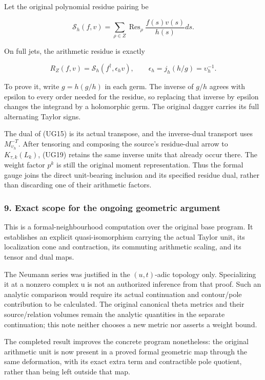 Let the original polynomial residue pairing be

\[
\mathscr S_h(f,v)=\sum_{\rho\in Z}\operatorname{Res}_\rho
\frac{f(s)v(s)}{h(s)}ds.
\]

On full jets, the arithmetic residue is exactly

\[
\boxed{R_Z(f,v)=\mathscr S_h(f^\dagger,\epsilon_hv),
\qquad\epsilon_h=j_h(h/g)=\upsilon_h^{-1}.}
\tag{UG19}
\]

To prove it, write \(g=h(g/h)\) in each germ. The inverse of \(g/h\) agrees with epsilon to every order needed for the residue, so replacing that inverse by epsilon changes the integrand by a holomorphic germ. The original dagger carries its full alternating Taylor signs.

The dual of (UG15) is its actual transpose, and the inverse-dual transport uses \(M_{\upsilon_h}^{-T}\). After tensoring and composing the source's residue-dual arrow to \(K_{\tau,k}(L_k)\), (UG19) retains the same inverse units that already occur there. The weight factor \(p^k\) is still the original moment representation. Thus the formal gauge joins the direct unit-bearing inclusion and its specified residue dual, rather than discarding one of their arithmetic factors.

\subsubsection{9. Exact scope for the ongoing geometric argument}\label{endpoint-f1_unit_gauge--exact-scope-for-the-ongoing-geometric-argument}

This is a formal-neighbourhood computation over the original base program. It establishes an explicit quasi-isomorphism carrying the actual Taylor unit, its localization cone and contraction, its commuting arithmetic scaling, and its tensor and dual maps.

The Neumann series was justified in the \((u,t)\)-adic topology only. Specializing it at a nonzero complex u is not an authorized inference from that proof. Such an analytic comparison would require its actual continuation and contour/pole contribution to be calculated. The original canonical theta metrics and their source/relation volumes remain the analytic quantities in the separate continuation; this note neither chooses a new metric nor asserts a weight bound.

The completed result improves the concrete program nonetheless: the original arithmetic unit is now present in a proved formal geometric map through the same deformation, with its exact extra term and contractible pole quotient, rather than being left outside that map.

